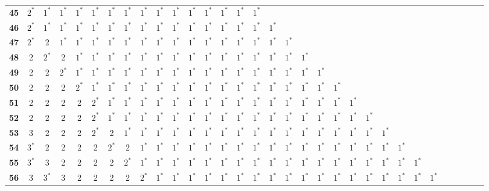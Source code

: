\begin{sidewaystable}
\begin{tabular}{|c| c c c c c c c c c c c c c c c c c c c c c c c c c c c c c c c |}
\textbf{45} & $2^*$ & $1^*$ & $1^*$ & $1^*$ & $1^*$ & $1^*$ & $1^*$ & $1^*$ & $1^*$ & $1^*$ & $1^*$ & $1^*$ & $1^*$ & $1^*$ & $1^*$ & & & & & & & & & & & & & & & & \\
\textbf{46} & $2^*$ & $1^*$ & $1^*$ & $1^*$ & $1^*$ & $1^*$ & $1^*$ & $1^*$ & $1^*$ & $1^*$ & $1^*$ & $1^*$ & $1^*$ & $1^*$ & $1^*$ & $1^*$ & & & & & & & & & & & & & & & \\
\textbf{47} & $2^*$ & 2 & $1^*$ & $1^*$ & $1^*$ & $1^*$ & $1^*$ & $1^*$ & $1^*$ & $1^*$ & $1^*$ & $1^*$ & $1^*$ & $1^*$ & $1^*$ & $1^*$ & $1^*$ & & & & & & & & & & & & & & \\
\textbf{48} & 2 & $2^*$ & 2 & $1^*$ & $1^*$ & $1^*$ & $1^*$ & $1^*$ & $1^*$ & $1^*$ & $1^*$ & $1^*$ & $1^*$ & $1^*$ & $1^*$ & $1^*$ & $1^*$ & $1^*$ & & & & & & & & & & & & & \\
\textbf{49} & 2 & 2 & $2^*$ & $1^*$ & $1^*$ & $1^*$ & $1^*$ & $1^*$ & $1^*$ & $1^*$ & $1^*$ & $1^*$ & $1^*$ & $1^*$ & $1^*$ & $1^*$ & $1^*$ & $1^*$ & $1^*$ & & & & & & & & & & & & \\
\textbf{50} & 2 & 2 & 2 & $2^*$ & $1^*$ & $1^*$ & $1^*$ & $1^*$ & $1^*$ & $1^*$ & $1^*$ & $1^*$ & $1^*$ & $1^*$ & $1^*$ & $1^*$ & $1^*$ & $1^*$ & $1^*$ & $1^*$ & & & & & & & & & & & \\
\textbf{51} & 2 & 2 & 2 & 2 & $2^*$ & $1^*$ & $1^*$ & $1^*$ & $1^*$ & $1^*$ & $1^*$ & $1^*$ & $1^*$ & $1^*$ & $1^*$ & $1^*$ & $1^*$ & $1^*$ & $1^*$ & $1^*$ & $1^*$ & & & & & & & & & & \\
\textbf{52} & 2 & 2 & 2 & 2 & $2^*$ & $1^*$ & $1^*$ & $1^*$ & $1^*$ & $1^*$ & $1^*$ & $1^*$ & $1^*$ & $1^*$ & $1^*$ & $1^*$ & $1^*$ & $1^*$ & $1^*$ & $1^*$ & $1^*$ & $1^*$ & & & & & & & & & \\
\textbf{53} & 3 & 2 & 2 & 2 & $2^*$ & 2 & $1^*$ & $1^*$ & $1^*$ & $1^*$ & $1^*$ & $1^*$ & $1^*$ & $1^*$ & $1^*$ & $1^*$ & $1^*$ & $1^*$ & $1^*$ & $1^*$ & $1^*$ & $1^*$ & $1^*$ & & & & & & & & \\
\textbf{54} & $3^*$ & 2 & 2 & 2 & 2 & $2^*$ & 2 & $1^*$ & $1^*$ & $1^*$ & $1^*$ & $1^*$ & $1^*$ & $1^*$ & $1^*$ & $1^*$ & $1^*$ & $1^*$ & $1^*$ & $1^*$ & $1^*$ & $1^*$ & $1^*$ & $1^*$ & & & & & & & \\
\textbf{55} & $3^*$ & 3 & 2 & 2 & 2 & 2 & $2^*$ & $1^*$ & $1^*$ & $1^*$ & $1^*$ & $1^*$ & $1^*$ & $1^*$ & $1^*$ & $1^*$ & $1^*$ & $1^*$ & $1^*$ & $1^*$ & $1^*$ & $1^*$ & $1^*$ & $1^*$ & $1^*$ & & & & & & \\
\textbf{56} & 3 & $3^*$ & 3 & 2 & 2 & 2 & 2 & $2^*$ & $1^*$ & $1^*$ & $1^*$ & $1^*$ & $1^*$ & $1^*$ & $1^*$ & $1^*$ & $1^*$ & $1^*$ & $1^*$ & $1^*$ & $1^*$ & $1^*$ & $1^*$ & $1^*$ & $1^*$ & $1^*$ & & & & & \\

\end{tabular}
\end{sidewaystable}
